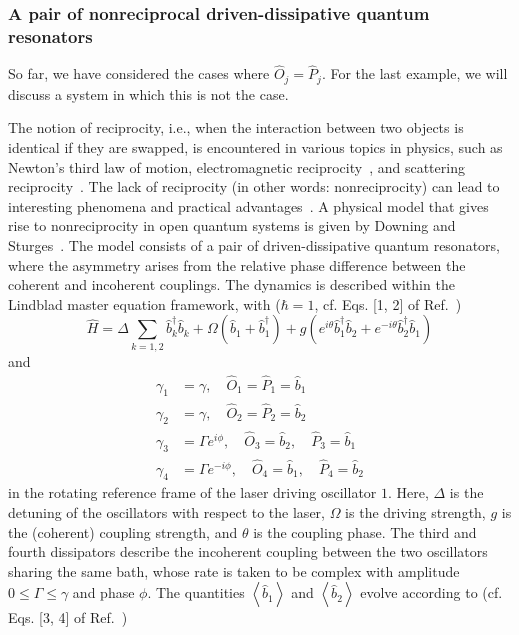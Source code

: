 \documentclass[5p, twocolumn, 10pt, sort&compress]{elsarticle}
\newcounter{bla}
\newcommand{\expval}[1]{\left\langle{#1}\right\rangle}
\newcommand{\bop}{\hat{b}}
\newcommand{\bdag}{\bop^\dagger}
\begin{document}

\subsubsection{A pair of nonreciprocal driven-dissipative quantum resonators}

So far, we have considered the cases where $\hat{O}_j=\hat{P}_j$.  For the last example, we will discuss a system in which this is not the case. 

The notion of reciprocity, i.e., when the interaction between two objects is identical if they are swapped, is encountered in various topics in physics, such as Newton's third law of motion, electromagnetic reciprocity~\cite{Caloz2018}, and scattering reciprocity~\cite{Dek2012}. The lack of reciprocity (in other words: nonreciprocity) can lead to interesting phenomena and practical advantages~\cite{Downing2022}. A physical model that gives rise to nonreciprocity in open quantum systems is given by Downing and Sturges~\cite{Downing2022}. The model consists of a pair of driven-dissipative quantum resonators, where the asymmetry arises from the relative phase difference between the coherent and incoherent couplings. The dynamics is described within the Lindblad master equation framework, with ($\hbar=1$, cf. Eqs. [1, 2] of Ref.~\cite{Downing2022})
\begin{equation}
    \hat{H} = \Delta\sum_{k=1,2}\bdag_k\bop_k + \Omega\left(\bop_1+\bdag_1\right) + g\left(e^{i\theta}\bdag_1\bop_2 + e^{-i\theta}\bdag_2\bop_1\right) 
\end{equation}
and
\begin{subequations}
\begin{align}
    \gamma_1 &= \gamma, \quad \hat{O}_1=\hat{P}_1=\bop_1
    \\
    \gamma_2 &= \gamma, \quad \hat{O}_2=\hat{P}_2=\bop_2
    \\
    \gamma_3 &= \Gamma e^{i\phi}, \quad \hat{O}_3=\bop_2,\quad \hat{P}_3=\bop_1
    \\
    \gamma_4 &= \Gamma e^{-i\phi}, \quad \hat{O}_4 = \bop_1,\quad \hat{P}_4 = \bop_2
\end{align}
\end{subequations}
in the rotating reference frame of the laser driving oscillator $1$. Here, $\Delta$ is the detuning of the oscillators with respect to the laser, $\Omega$ is the driving strength, $g$ is the (coherent) coupling strength, and $\theta$ is the coupling phase.  The third and fourth dissipators describe the incoherent coupling between the two oscillators sharing the same bath, whose rate is taken to be complex with amplitude $0\leq \Gamma\leq \gamma$ and phase $\phi$.  The quantities $\expval{\bop_1}$ and $\expval{\bop_2}$ evolve according to (cf. Eqs. [3, 4] of Ref.~\cite{Downing2022})
\end{document}
